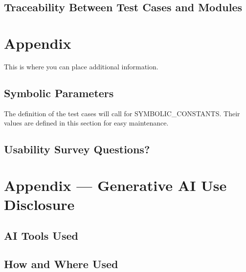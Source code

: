 \documentclass[12pt, titlepage]{article}
\begin{document}
\subsection{Traceability Between Test Cases and Modules}

				




\newpage

\section{Appendix}

This is where you can place additional information.

\subsection{Symbolic Parameters}

The definition of the test cases will call for SYMBOLIC\_CONSTANTS.
Their values are defined in this section for easy maintenance.

\subsection{Usability Survey Questions?}


\newpage{}

\section{Appendix --- Generative AI Use Disclosure}


\subsection{AI Tools Used}


\subsection{How and Where Used}
\end{document}
